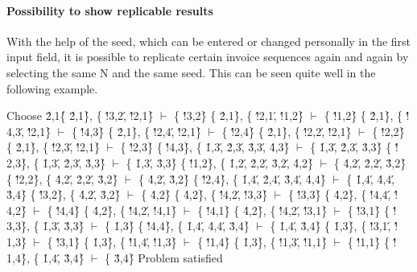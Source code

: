 \paragraph{Possibility to show replicable results}
With the help of the seed, which can be entered or changed personally in the first input field, it is possible to replicate certain invoice sequences again and again by selecting the same N and the same seed. This can be seen quite well in the following example.
%
\begin{listing}
Choose \'2,1\'
\{ \'2,1\' \}, \{ \'!3,2\', \'!2,1\' \} $\vdash$ \{ \'!3,2\' \}
\{ \'2,1\' \}, \{ \'!2,1\', \'!1,2\' \} $\vdash$ \{ \'!1,2\' \}
\{ \'2,1\' \}, \{ \'!4,3\', \'!2,1\' \} $\vdash$ \{ \'!4,3\' \}
\{ \'2,1\' \}, \{ \'!2,4\', \'!2,1\' \} $\vdash$ \{ \'!2,4\' \}
\{ \'2,1\' \}, \{ \'!2,2\', \'!2,1\' \} $\vdash$ \{ \'!2,2\' \}
\{ \'2,1\' \}, \{ \'!2,3\', \'!2,1\' \} $\vdash$ \{ \'!2,3\' \}
\{ \'!4,3\' \}, \{ \'1,3\', \'2,3\', \'3,3\', \'4,3\' \} $\vdash$ \{ \'1,3\', \'2,3\', \'3,3\' \}
\{ \'!2,3\' \}, \{ \'1,3\', \'2,3\', \'3,3\' \} $\vdash$ \{ \'1,3\', \'3,3\' \}
\{ \'!1,2\' \}, \{ \'1,2\', \'2,2\', \'3,2\', \'4,2\' \} $\vdash$ \{ \'4,2\', \'2,2\', \'3,2\' \}
\{ \'!2,2\' \}, \{ \'4,2\', \'2,2\', \'3,2\' \} $\vdash$ \{ \'4,2\', \'3,2\' \}
\{ \'!2,4\' \}, \{ \'1,4\', \'2,4\', \'3,4\', \'4,4\' \} $\vdash$ \{ \'1,4\', \'4,4\', \'3,4\' \}
\{ \'!3,2\' \}, \{ \'4,2\', \'3,2\' \} $\vdash$ \{ \'4,2\' \}
\{ \'4,2\' \}, \{ \'!4,2\', \'!3,3\' \} $\vdash$ \{ \'!3,3\' \}
\{ \'4,2\' \}, \{ \'!4,4\', \'!4,2\' \} $\vdash$ \{ \'!4,4\' \}
\{ \'4,2\' \}, \{ \'!4,2\', \'!4,1\' \} $\vdash$ \{ \'!4,1\' \}
\{ \'4,2\' \}, \{ \'!4,2\', \'!3,1\' \} $\vdash$ \{ \'!3,1\' \}
\{ \'!3,3\' \}, \{ \'1,3\', \'3,3\' \} $\vdash$ \{ \'1,3\' \}
\{ \'!4,4\' \}, \{ \'1,4\', \'4,4\', \'3,4\' \} $\vdash$ \{ \'1,4\', \'3,4\' \}
\{ \'1,3\' \}, \{ \'!3,1\', \'!1,3\' \} $\vdash$ \{ \'!3,1\' \}
\{ \'1,3\' \}, \{ \'!1,4\', \'!1,3\' \} $\vdash$ \{ \'!1,4\' \}
\{ \'1,3\' \}, \{ \'!1,3\', \'!1,1\' \} $\vdash$ \{ \'!1,1\' \}
\{ \'!1,4\' \}, \{ \'1,4\', \'3,4\' \} $\vdash$ \{ \'3,4\' \}
Problem satisfied
\end{listing}
